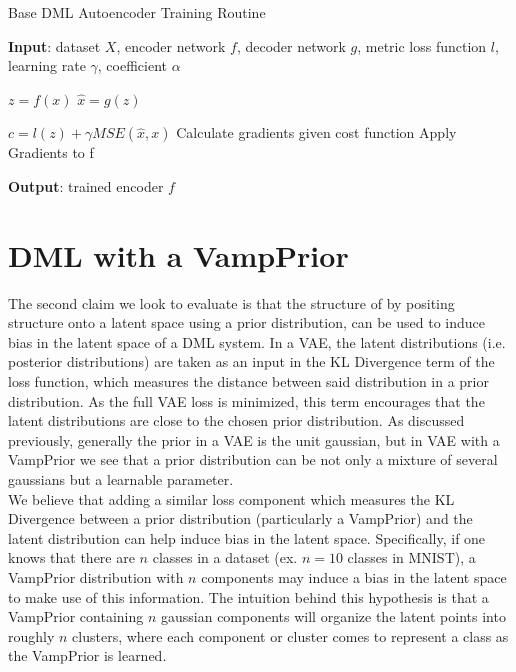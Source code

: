 \documentclass[./dissertation.tex]{subfiles}
\begin{document}
    \begin{algorithm}
    \caption{Base DML Autoencoder Training Routine}\label{alg:cap}
    \hspace*{\algorithmicindent} \textbf{Input}: dataset $X$, encoder network $f$, decoder network $g$, metric loss function $l$, learning rate $\gamma$, coefficient $\alpha$
    \begin{algorithmic}[1]
        \State $z = f(x)$
        \State $\hat{x} = g(z)$
        
        \State $c = l(z) + \gamma MSE(\hat{x}, x)$
        \State Calculate gradients given cost function
        \State Apply Gradients to f
    \EndFor
    \end{algorithmic}
    \hspace*{\algorithmicindent} \textbf{Output}: trained encoder $f$
    \end{algorithm}

    \section{DML with a VampPrior}
    The second claim we look to evaluate is that the structure of by positing structure onto a latent space using a prior distribution, can be used to induce bias in the latent space of a DML system. In a VAE, the latent distributions (i.e. posterior distributions) are taken as an input in the KL Divergence term of the loss function, which measures the distance between said distribution in a prior distribution. As the full VAE loss is minimized, this term encourages that the latent distributions are close to the chosen prior distribution. As discussed previously, generally the prior in a VAE is the unit gaussian, but in VAE with a VampPrior \cite{} we see that a prior distribution can be not only a mixture of several gaussians but a learnable parameter. \\
    
    We believe that adding a similar loss component which measures the KL Divergence between a prior distribution (particularly a VampPrior) and the latent distribution can help induce bias in the latent space. Specifically, if one knows that there are $n$ classes in a dataset (ex. $n = 10$ classes in MNIST), a VampPrior distribution with $n$ components may induce a bias in the latent space to make use of this information. The intuition behind this hypothesis is that a VampPrior containing $n$ gaussian components will organize the latent points into roughly $n$ clusters, where each component or cluster comes to represent a class as the VampPrior is learned. \\
    
\end{document}
